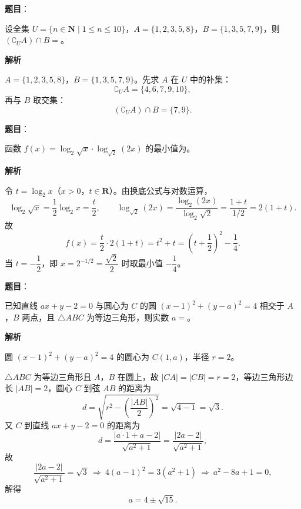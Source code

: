 \begin{answer}

\textbf{题目}：

设全集 $U=\{n\in\mathbf N\mid 1\leqslant n\leqslant 10\}$，$A=\{1,2,3,5,8\}$，$B=\{1,3,5,7,9\}$，则 $(\complement_U A)\cap B=$\gkblank{}。

\textbf{解析}

$A=\{1,2,3,5,8\}$，$B=\{1,3,5,7,9\}$。先求 $A$ 在 $U$ 中的补集：
\nopagebreak[4]
\[\complement_U A=\{4,6,7,9,10\},\]
再与 $B$ 取交集：
\nopagebreak[4]
\[(\complement_U A)\cap B=\{7,9\}.\]


\end{answer}
\begin{answer}

\textbf{题目}：

函数 $f(x)=\log_2\sqrt x\cdot\log_{\sqrt2}(2x)$ 的最小值为\gkblank{}。

\textbf{解析}

令 $t=\log_2x$（$x>0$，$t\in\mathbf R$）。由换底公式与对数运算，
\nopagebreak[4]
\[\log_2\sqrt x=\frac12\log_2x=\frac t2,\qquad
\log_{\sqrt2}(2x)=\frac{\log_2(2x)}{\log_2\sqrt2}=\frac{1+t}{1/2}=2(1+t).\]
故
\nopagebreak[4]
\[f(x)=\frac t2\cdot2(1+t)=t^2+t=\left(t+\frac12\right)^2-\frac14 .\]
当 $t=-\dfrac12$，即 $x=2^{-1/2}=\dfrac{\sqrt2}2$ 时取最小值 $-\dfrac14$。


\end{answer}
\begin{answer}

\textbf{题目}：

已知直线 $ax+y-2=0$ 与圆心为 $C$ 的圆 $(x-1)^2+(y-a)^2=4$ 相交于 $A$，$B$ 两点，且 $\triangle ABC$ 为等边三角形，则实数 $a=$\gkblank{}。

\textbf{解析}

圆 $(x-1)^2+(y-a)^2=4$ 的圆心为 $C(1,a)$，半径 $r=2$。

$\triangle ABC$ 为等边三角形且 $A$，$B$ 在圆上，故 $|CA|=|CB|=r=2$，等边三角形边长 $|AB|=2$，圆心 $C$ 到弦 $AB$ 的距离为
\nopagebreak[4]
\[d=\sqrt{r^2-\left(\frac{|AB|}2\right)^2}=\sqrt{4-1}=\sqrt3 .\]
又 $C$ 到直线 $ax+y-2=0$ 的距离为
\nopagebreak[4]
\[d=\frac{|a\cdot1+a-2|}{\sqrt{a^2+1}}=\frac{|2a-2|}{\sqrt{a^2+1}},\]
故
\nopagebreak[4]
\[\frac{|2a-2|}{\sqrt{a^2+1}}=\sqrt3
\ \Longrightarrow\ 4(a-1)^2=3(a^2+1)
\ \Longrightarrow\ a^2-8a+1=0,\]
解得
\nopagebreak[4]
\[a=4\pm\sqrt{15}.\]


\end{answer}
